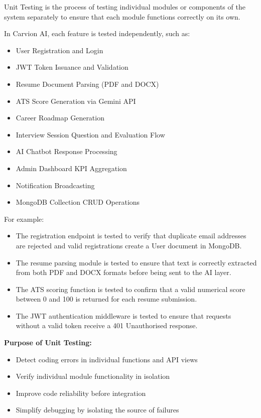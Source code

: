 \documentclass[12pt]{article}
\begin{document}
Unit Testing is the process of testing individual modules or components of the system separately to ensure that each module functions correctly on its own.

In Carvion AI, each feature is tested independently, such as:

\begin{itemize}
  \item User Registration and Login
  \item JWT Token Issuance and Validation
  \item Resume Document Parsing (PDF and DOCX)
  \item ATS Score Generation via Gemini API
  \item Career Roadmap Generation
  \item Interview Session Question and Evaluation Flow
  \item AI Chatbot Response Processing
  \item Admin Dashboard KPI Aggregation
  \item Notification Broadcasting
  \item MongoDB Collection CRUD Operations
\end{itemize}

For example:

\begin{itemize}
  \item The registration endpoint is tested to verify that duplicate email addresses are rejected and valid registrations create a User document in MongoDB.
  \item The resume parsing module is tested to ensure that text is correctly extracted from both PDF and DOCX formats before being sent to the AI layer.
  \item The ATS scoring function is tested to confirm that a valid numerical score between 0 and 100 is returned for each resume submission.
  \item The JWT authentication middleware is tested to ensure that requests without a valid token receive a 401 Unauthorised response.
\end{itemize}

\textbf{Purpose of Unit Testing:}

\begin{itemize}
  \item Detect coding errors in individual functions and API views
  \item Verify individual module functionality in isolation
  \item Improve code reliability before integration
  \item Simplify debugging by isolating the source of failures
\end{itemize}
\end{document}
